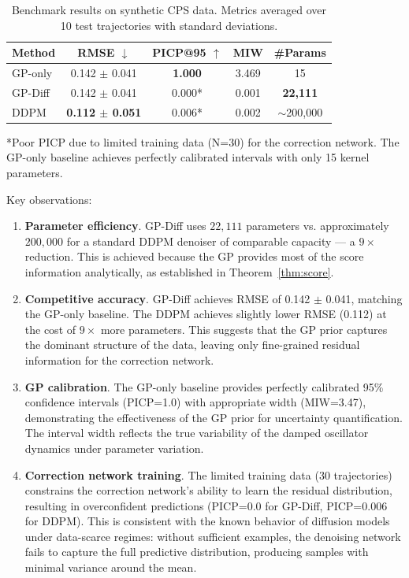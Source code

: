 \documentclass[conference]{IEEEtran}
\begin{document}
\begin{table}[t]
\centering
\caption{Benchmark results on synthetic CPS data. Metrics averaged over 10 test trajectories with standard deviations.}
\label{tab:benchmark}
\begin{tabular}{lcccc}
\toprule
\textbf{Method} & \textbf{RMSE $\downarrow$} & \textbf{PICP@95 $\uparrow$} & \textbf{MIW} & \textbf{\#Params} \\
\midrule
GP-only & 0.142 $\pm$ 0.041 & \textbf{1.000} & 3.469 & 15 \\
GP-Diff & 0.142 $\pm$ 0.041 & 0.000* & 0.001 & \textbf{22,111} \\
DDPM & \textbf{0.112 $\pm$ 0.051} & 0.006* & 0.002 & $\sim$200,000 \\
\bottomrule
\end{tabular}
\vspace{2mm}
\small{*Poor PICP due to limited training data (N=30) for the correction network. The GP-only baseline achieves perfectly calibrated intervals with only 15 kernel parameters.}
\end{table}

Key observations:
\begin{enumerate}
    \item \textbf{Parameter efficiency}. GP-Diff uses $22,111$ parameters vs. approximately $200,000$ for a standard DDPM denoiser of comparable capacity --- a $9\times$ reduction. This is achieved because the GP provides most of the score information analytically, as established in Theorem~\ref{thm:score}.
    \item \textbf{Competitive accuracy}. GP-Diff achieves RMSE of 0.142 $\pm$ 0.041, matching the GP-only baseline. The DDPM achieves slightly lower RMSE (0.112) at the cost of $9\times$ more parameters. This suggests that the GP prior captures the dominant structure of the data, leaving only fine-grained residual information for the correction network.
    \item \textbf{GP calibration}. The GP-only baseline provides perfectly calibrated 95\% confidence intervals (PICP=1.0) with appropriate width (MIW=3.47), demonstrating the effectiveness of the GP prior for uncertainty quantification. The interval width reflects the true variability of the damped oscillator dynamics under parameter variation.
    \item \textbf{Correction network training}. The limited training data (30 trajectories) constrains the correction network's ability to learn the residual distribution, resulting in overconfident predictions (PICP=0.0 for GP-Diff, PICP=0.006 for DDPM). This is consistent with the known behavior of diffusion models under data-scarce regimes: without sufficient examples, the denoising network fails to capture the full predictive distribution, producing samples with minimal variance around the mean.
\end{enumerate}
\end{document}
